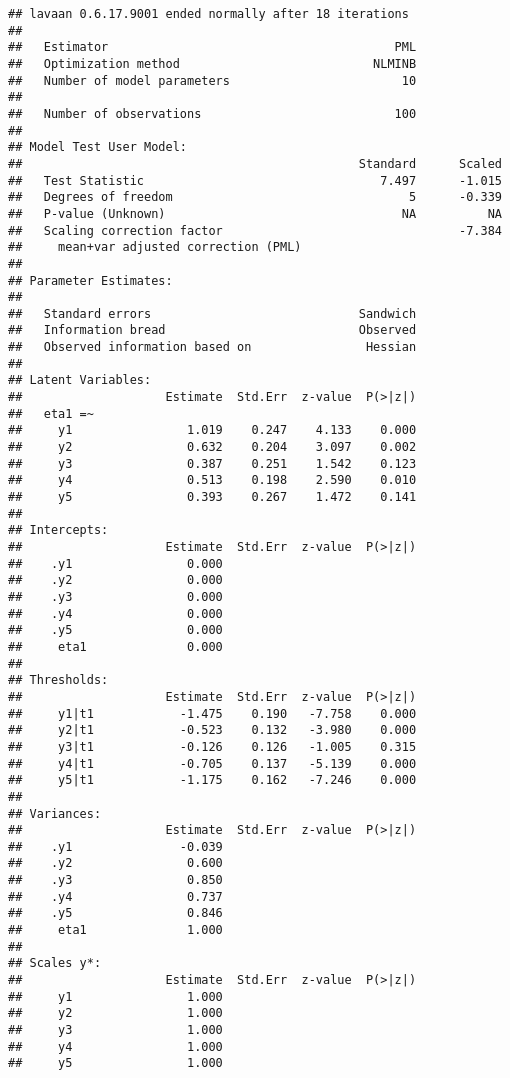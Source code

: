\documentclass[
]{article}
\begin{document}
\begin{verbatim}
## lavaan 0.6.17.9001 ended normally after 18 iterations
## 
##   Estimator                                        PML
##   Optimization method                           NLMINB
##   Number of model parameters                        10
## 
##   Number of observations                           100
## 
## Model Test User Model:
##                                               Standard      Scaled
##   Test Statistic                                 7.497      -1.015
##   Degrees of freedom                                 5      -0.339
##   P-value (Unknown)                                 NA          NA
##   Scaling correction factor                                 -7.384
##     mean+var adjusted correction (PML)                            
## 
## Parameter Estimates:
## 
##   Standard errors                             Sandwich
##   Information bread                           Observed
##   Observed information based on                Hessian
## 
## Latent Variables:
##                    Estimate  Std.Err  z-value  P(>|z|)
##   eta1 =~                                             
##     y1                1.019    0.247    4.133    0.000
##     y2                0.632    0.204    3.097    0.002
##     y3                0.387    0.251    1.542    0.123
##     y4                0.513    0.198    2.590    0.010
##     y5                0.393    0.267    1.472    0.141
## 
## Intercepts:
##                    Estimate  Std.Err  z-value  P(>|z|)
##    .y1                0.000                           
##    .y2                0.000                           
##    .y3                0.000                           
##    .y4                0.000                           
##    .y5                0.000                           
##     eta1              0.000                           
## 
## Thresholds:
##                    Estimate  Std.Err  z-value  P(>|z|)
##     y1|t1            -1.475    0.190   -7.758    0.000
##     y2|t1            -0.523    0.132   -3.980    0.000
##     y3|t1            -0.126    0.126   -1.005    0.315
##     y4|t1            -0.705    0.137   -5.139    0.000
##     y5|t1            -1.175    0.162   -7.246    0.000
## 
## Variances:
##                    Estimate  Std.Err  z-value  P(>|z|)
##    .y1               -0.039                           
##    .y2                0.600                           
##    .y3                0.850                           
##    .y4                0.737                           
##    .y5                0.846                           
##     eta1              1.000                           
## 
## Scales y*:
##                    Estimate  Std.Err  z-value  P(>|z|)
##     y1                1.000                           
##     y2                1.000                           
##     y3                1.000                           
##     y4                1.000                           
##     y5                1.000
\end{verbatim}
\end{document}
